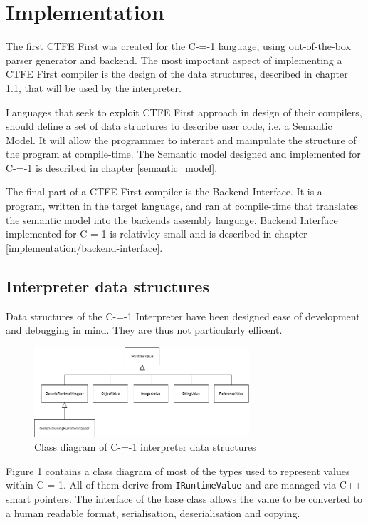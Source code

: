 \section{Implementation}
\label{implementation}

The first CTFE First was created for the C-=-1 language, using out-of-the-box parser generator and backend.
The most important aspect of implementing a CTFE First compiler is the design of the data structures, described in chapter \ref{data_structures}, that will be used by the interpreter.

Languages that seek to exploit CTFE First approach in design of their compilers, should define a set of data structures to describe user code, i.e. a Semantic Model. %
It will allow the programmer to interact and mainpulate the structure of the program at compile-time.
The Semantic model designed and implemented for C-=-1 is described in chapter \ref{semantic_model}.

The final part of a CTFE First compiler is the Backend Interface.
It is a program, written in the target language, and ran at compile-time that translates the semantic model into the backends assembly language.
Backend Interface implemented for C-=-1 is relativley small and is described in chapter \ref{implementation/backend-interface}.

\subsection{Interpreter data structures}
\label{data_structures}
Data structures of the C-=-1 Interpreter have been designed ease of development and debugging in mind.
They are thus not particularly efficent.

\begin{figure}
	\includegraphics[width=8cm]{pictures/interpreter_data_structures_uml.png}
	\caption{Class diagram of C-=-1 interpreter data structures}
	\label{fig:interpreter_data_structures}
\end{figure}

Figure \ref{fig:interpreter_data_structures} contains a class diagram of most of the types used to represent values within C-=-1.
All of them derive from \lstinline{IRuntimeValue} and are managed via C++ smart pointers.
The interface of the base class allows the value to be converted to a human readable format, serialisation, deserialisation and copying.

